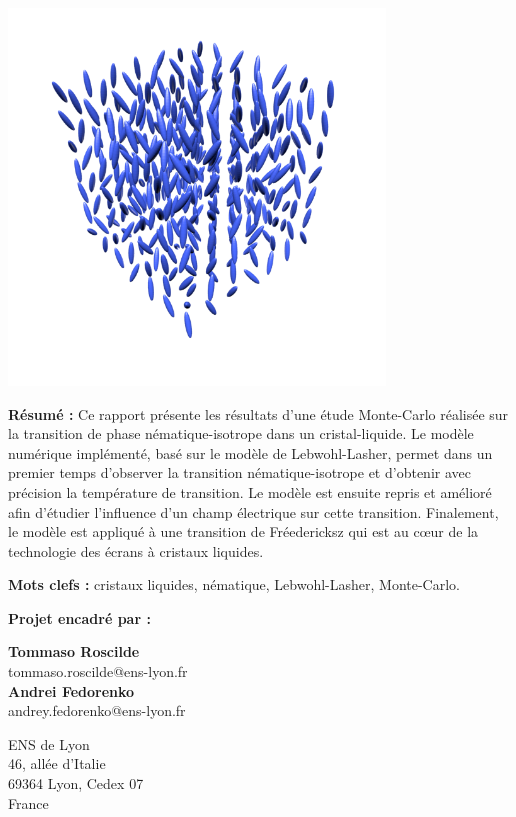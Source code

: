 \documentclass[11pt,a4paper]{article}
\numberwithin{equation}{section}
\begin{document}
\begin{titlepage}
\begin{center}
\includegraphics[height=10cm]{figures/cristaux_liquides.png} 
\end{center} 
\vspace{-0.5cm}

\textbf{Résumé :} 
Ce rapport présente les résultats d'une étude Monte-Carlo réalisée sur la transition de phase nématique-isotrope dans un cristal-liquide. Le modèle numérique implémenté, basé sur le modèle de Lebwohl-Lasher, permet dans un premier temps d'observer la transition nématique-isotrope et d'obtenir avec précision la température de transition. Le modèle est ensuite repris et amélioré afin d'étudier l'influence d'un champ électrique sur cette transition. Finalement, le modèle est appliqué à une transition de Fréedericksz qui est au cœur de la technologie des écrans à cristaux liquides.
\vspace{0.3cm}

\textbf{Mots clefs :} cristaux liquides, nématique, Lebwohl-Lasher, Monte-Carlo.
\vspace{0.3cm}

\textbf{Projet encadré par :} 

\begin{center}
\begin{multicols}{2}

{\bf Tommaso Roscilde } \\
tommaso.roscilde@ens-lyon.fr \\

{\bf Andrei Fedorenko} \\
andrey.fedorenko@ens-lyon.fr\\
\end{multicols}

ENS de Lyon\\
46, allée d'Italie\\ 69364 Lyon, Cedex 07\\ France



\end{center}

\end{titlepage}
\end{document}
